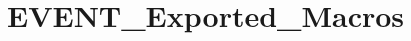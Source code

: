 \hypertarget{group___e_v_e_n_t___exported___macros}{}\section{E\+V\+E\+N\+T\+\_\+\+Exported\+\_\+\+Macros}
\label{group___e_v_e_n_t___exported___macros}
